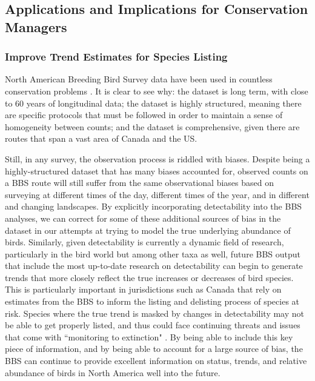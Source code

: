 \documentclass[12pt]{article}
\begin{document}
\subsection{Applications and Implications for Conservation Managers}
\subsubsection{Improve Trend Estimates for Species Listing}

\par North American Breeding Bird Survey data have been used in countless conservation problems \citep{hudson_role_2017}.
It is clear to see why: the dataset is long term, with close to 60 years of longitudinal data; the dataset is highly structured, meaning there are specific protocols that must be followed in order to maintain a sense of homogeneity between counts; and the dataset is comprehensive, given there are routes that span a vast area of Canada and the US.

\par Still, in any survey, the observation process is riddled with biases.
Despite being a highly-structured dataset that has many biases accounted for, observed counts on a BBS route will still suffer from the same observational biases based on surveying at different times of the day, different times of the year, and in different and changing landscapes.
By explicitly incorporating detectability into the BBS analyses, we can correct for some of these additional sources of bias in the dataset in our attempts at trying to model the true underlying abundance of birds.
Similarly, given detectability is currently a dynamic field of research, particularly in the bird world but among other taxa as well, future BBS output that include the most up-to-date research on detectability can begin to generate trends that more closely reflect the true increases or decreases of bird species.
This is particularly important in jurisdictions such as Canada that rely on estimates from the BBS to inform the listing and delisting process of species at risk.
Species where the true trend is masked by changes in detectability may not be able to get properly listed, and thus could face continuing threats and issues that come with ``monitoring to extinction" \citep{martin_acting_2012, lindenmayer_counting_2013}.
By being able to include this key piece of information, and by being able to account for a large source of bias, the BBS can continue to provide excellent information on status, trends, and relative abundance of birds in North America well into the future.
\end{document}
